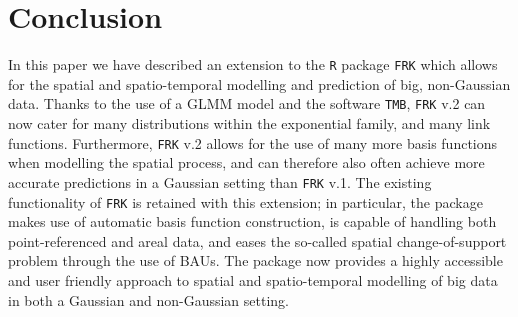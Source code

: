 \documentclass[12pt,a4paper]{article}
\begin{document}



\section{Conclusion}
\label{SEC:Conclusion}


In this paper we have described an extension to the \texttt{R} package \texttt{FRK} which allows for the spatial and spatio-temporal modelling and prediction of big, non-Gaussian data. 
Thanks to the use of a GLMM model and the software \texttt{TMB}, \texttt{FRK} v.2 can now cater for many distributions within the exponential family, and many link functions. 
Furthermore, \texttt{FRK} v.2 allows for the use of many more basis functions when modelling the spatial process, and can therefore also often achieve more accurate predictions in a Gaussian setting than \texttt{FRK} v.1. 
The existing functionality of \texttt{FRK} is retained with this extension; in particular, the package makes use of automatic basis function construction, is capable of handling both point-referenced and areal data, and eases the so-called spatial change-of-support problem through the use of BAUs.
The package now provides a highly accessible and user friendly approach to spatial and spatio-temporal modelling of big data in both a Gaussian and non-Gaussian setting.
\end{document}
